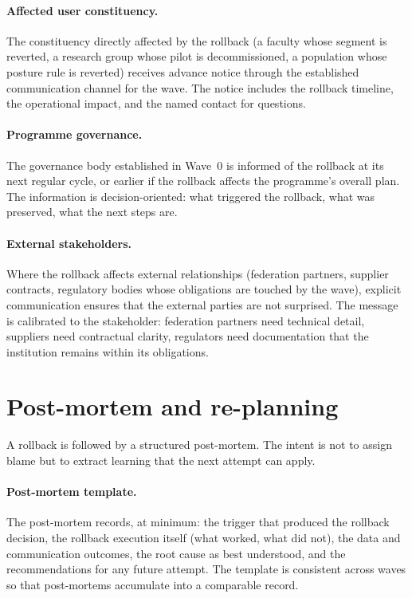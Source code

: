 \paragraph{Affected user constituency.} The constituency directly
affected by the rollback (a faculty whose segment is reverted, a
research group whose pilot is decommissioned, a population whose
posture rule is reverted) receives advance notice through the
established communication channel for the wave. The notice
includes the rollback timeline, the operational impact, and the
named contact for questions.

\paragraph{Programme governance.} The governance body established
in Wave~0 is informed of the rollback at its next regular cycle,
or earlier if the rollback affects the programme's overall plan.
The information is decision-oriented: what triggered the
rollback, what was preserved, what the next steps are.

\paragraph{External stakeholders.} Where the rollback affects
external relationships (federation partners, supplier
contracts, regulatory bodies whose obligations are touched by
the wave), explicit communication ensures that the external
parties are not surprised. The message is calibrated to the
stakeholder: federation partners need technical detail,
suppliers need contractual clarity, regulators need
documentation that the institution remains within its
obligations.

\section{Post-mortem and re-planning}
\label{sec:rv-postmortem}

A rollback is followed by a structured post-mortem. The intent is
not to assign blame but to extract learning that the next attempt
can apply.

\paragraph{Post-mortem template.} The post-mortem records, at
minimum: the trigger that produced the rollback decision, the
rollback execution itself (what worked, what did not), the data and
communication outcomes, the root cause as best understood, and the
recommendations for any future attempt. The template is consistent
across waves so that post-mortems accumulate into a comparable
record.

